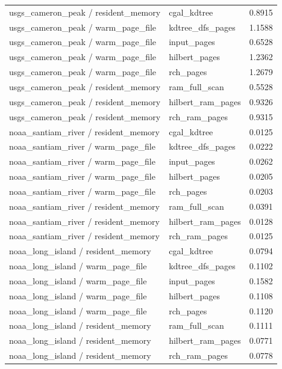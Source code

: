 \begin{tabular}{llr}
usgs\_cameron\_peak / resident\_memory & cgal\_kdtree & 0.8915 \\
usgs\_cameron\_peak / warm\_page\_file & kdtree\_dfs\_pages & 1.1588 \\
usgs\_cameron\_peak / warm\_page\_file & input\_pages & 0.6528 \\
usgs\_cameron\_peak / warm\_page\_file & hilbert\_pages & 1.2362 \\
usgs\_cameron\_peak / warm\_page\_file & rch\_pages & 1.2679 \\
usgs\_cameron\_peak / resident\_memory & ram\_full\_scan & 0.5528 \\
usgs\_cameron\_peak / resident\_memory & hilbert\_ram\_pages & 0.9326 \\
usgs\_cameron\_peak / resident\_memory & rch\_ram\_pages & 0.9315 \\
noaa\_santiam\_river / resident\_memory & cgal\_kdtree & 0.0125 \\
noaa\_santiam\_river / warm\_page\_file & kdtree\_dfs\_pages & 0.0222 \\
noaa\_santiam\_river / warm\_page\_file & input\_pages & 0.0262 \\
noaa\_santiam\_river / warm\_page\_file & hilbert\_pages & 0.0205 \\
noaa\_santiam\_river / warm\_page\_file & rch\_pages & 0.0203 \\
noaa\_santiam\_river / resident\_memory & ram\_full\_scan & 0.0391 \\
noaa\_santiam\_river / resident\_memory & hilbert\_ram\_pages & 0.0128 \\
noaa\_santiam\_river / resident\_memory & rch\_ram\_pages & 0.0125 \\
noaa\_long\_island / resident\_memory & cgal\_kdtree & 0.0794 \\
noaa\_long\_island / warm\_page\_file & kdtree\_dfs\_pages & 0.1102 \\
noaa\_long\_island / warm\_page\_file & input\_pages & 0.1582 \\
noaa\_long\_island / warm\_page\_file & hilbert\_pages & 0.1108 \\
noaa\_long\_island / warm\_page\_file & rch\_pages & 0.1120 \\
noaa\_long\_island / resident\_memory & ram\_full\_scan & 0.1111 \\
noaa\_long\_island / resident\_memory & hilbert\_ram\_pages & 0.0771 \\
noaa\_long\_island / resident\_memory & rch\_ram\_pages & 0.0778 \\

\end{tabular}
